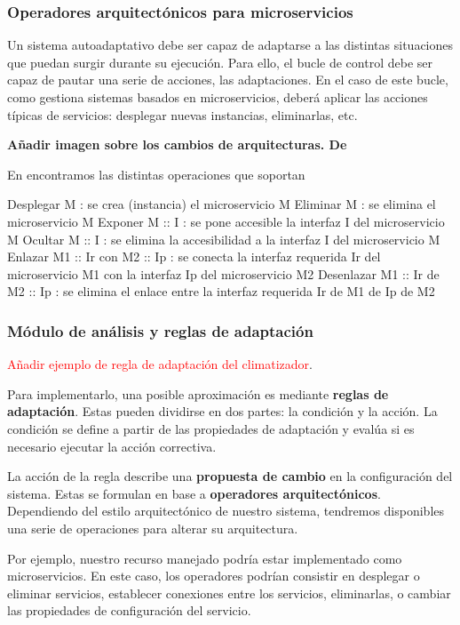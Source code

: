 \subsubsection{Operadores arquitectónicos para microservicios}

Un sistema autoadaptativo debe ser capaz de adaptarse a las distintas situaciones que puedan surgir durante su ejecución. Para ello, el bucle de control debe ser capaz de pautar una serie de acciones, las adaptaciones. En el caso de este bucle, como gestiona sistemas basados en microservicios, deberá aplicar las acciones típicas de servicios: desplegar nuevas instancias, eliminarlas, etc.

\textbf{Añadir imagen sobre los cambios de arquitecturas. De \cite{fonsServiciosAdaptivereadyPara2021}}

En \cite{fonsServiciosAdaptivereadyPara2021} encontramos las distintas operaciones que soportan

Desplegar M : se crea (instancia) el microservicio M
Eliminar M : se elimina el microservicio M
Exponer M :: I : se pone accesible la interfaz I del microservicio M
Ocultar M :: I : se elimina la accesibilidad a la interfaz I del microservicio M
Enlazar M1 :: Ir con M2 :: Ip : se conecta la interfaz requerida Ir del microservicio M1 con la interfaz Ip del microservicio M2
Desenlazar M1 :: Ir de M2 :: Ip : se elimina el enlace entre la interfaz requerida Ir de M1 de Ip de M2


\subsubsection{Módulo de análisis y reglas de adaptación}

\textcolor{red}{Añadir ejemplo de regla de adaptación del climatizador}.

Para implementarlo, una posible aproximación es mediante \textbf{reglas de adaptación}. Estas pueden dividirse en dos partes: la condición y la acción. La condición se define a partir de las propiedades de adaptación y evalúa si es necesario ejecutar la acción correctiva.

La acción de la regla describe una \textbf{propuesta de cambio} en la configuración del sistema. Estas se formulan en base a \textbf{operadores arquitectónicos}. \cite{garlanIncreasingSystemDependability2003} Dependiendo del estilo arquitectónico de nuestro sistema, tendremos disponibles una serie de operaciones para alterar su arquitectura.

Por ejemplo, nuestro recurso manejado podría estar implementado como microservicios. En este caso, los operadores podrían consistir en desplegar o eliminar servicios, establecer conexiones entre los servicios, eliminarlas, o cambiar las propiedades de configuración del servicio. \cite{fonsServiciosAdaptivereadyPara2021}

